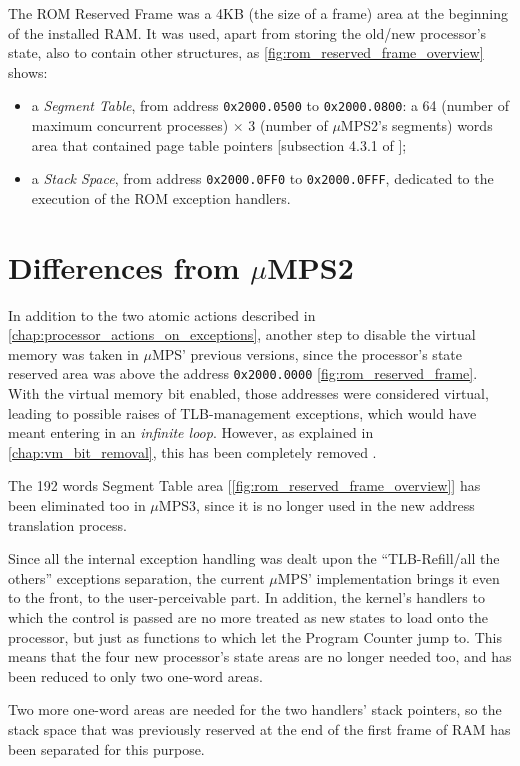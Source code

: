 \documentclass[12pt,a4paper,openright,twoside]{report}
\begin{document}
The ROM Reserved Frame was a 4KB (the size of a frame) area at the beginning of the installed RAM.
It was used, apart from storing the old/new processor's state, also to contain other structures, as \autoref{fig:rom_reserved_frame_overview} shows:
\begin{itemize}
	\item a \textit{Segment Table}, from address \texttt{0x2000.0500} to \texttt{0x2000.0800}: a 64 (number of maximum concurrent processes) $\times$ 3 (number of $\mu$MPS2's segments) words area that contained page table pointers [subsection 4.3.1 of \cite{old_pops}];
	\item a \textit{Stack Space}, from address \texttt{0x2000.0FF0} to \texttt{0x2000.0FFF}, dedicated to the execution of the ROM exception handlers.
\end{itemize}

\section{Differences from $\mu$MPS2}
In addition to the two atomic actions described in \autoref{chap:processor_actions_on_exceptions}, another step to disable the virtual memory was taken in $\mu$MPS' previous versions, since the processor's state reserved area was above the address \texttt{0x2000.0000} \autoref{fig:rom_reserved_frame}.
With the virtual memory bit enabled, those addresses were considered virtual, leading to possible raises of TLB-management exceptions, which would have meant entering in an \textit{infinite loop}.
However, as explained in \autoref{chap:vm_bit_removal}, this has been completely removed .

The 192 words Segment Table area [\autoref{fig:rom_reserved_frame_overview}] has been eliminated too in $\mu$MPS3, since it is no longer used in the new address translation process.

Since all the internal exception handling was dealt upon the ``TLB-Refill/all the others'' exceptions separation, the current $\mu$MPS' implementation brings it even to the front, to the user-perceivable part.
In addition, the kernel’s handlers to which the control is passed are no more treated as new states to load onto the processor, but just as functions to which let the Program Counter jump to.
This means that the four new processor’s state areas are no longer needed too, and has been reduced to only two one-word areas.

Two more one-word areas are needed for the two handlers' stack pointers, so the stack space that was previously reserved at the end of the first frame of RAM has been separated for this purpose.
\end{document}
